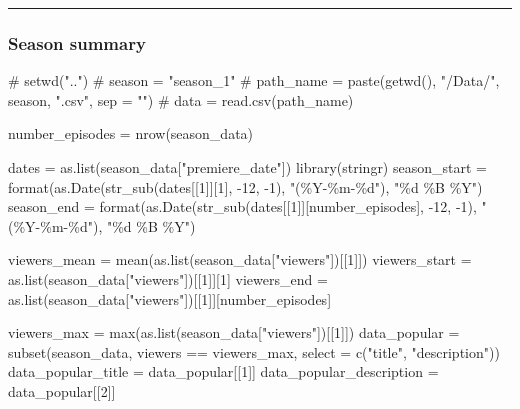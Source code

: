 \documentclass[
  letterpaper,
  DIV=11,
  numbers=noendperiod]{scrartcl}
\newenvironment{Shaded}{\begin{snugshade}}{\end{snugshade}}
\newcommand{\AttributeTok}[1]{\textcolor[rgb]{0.40,0.45,0.13}{#1}}
\newcommand{\CommentTok}[1]{\textcolor[rgb]{0.37,0.37,0.37}{#1}}
\newcommand{\DecValTok}[1]{\textcolor[rgb]{0.68,0.00,0.00}{#1}}
\newcommand{\FunctionTok}[1]{\textcolor[rgb]{0.28,0.35,0.67}{#1}}
\newcommand{\NormalTok}[1]{\textcolor[rgb]{0.00,0.23,0.31}{#1}}
\newcommand{\OtherTok}[1]{\textcolor[rgb]{0.00,0.23,0.31}{#1}}
\newcommand{\SpecialCharTok}[1]{\textcolor[rgb]{0.37,0.37,0.37}{#1}}
\newcommand{\StringTok}[1]{\textcolor[rgb]{0.13,0.47,0.30}{#1}}
\begin{document}
\begin{center}\rule{0.5\linewidth}{0.5pt}\end{center}

\hypertarget{season-summary}{%
\subsubsection{Season summary}\label{season-summary}}

\begin{Shaded}
\begin{Highlighting}[]
\CommentTok{\# setwd("..")}
\CommentTok{\# season = "season\_1"}
\CommentTok{\# path\_name = paste(getwd(), "/Data/", season, ".csv", sep = "")}
\CommentTok{\# data = read.csv(path\_name)}

\NormalTok{number\_episodes }\OtherTok{=} \FunctionTok{nrow}\NormalTok{(season\_data)}

\NormalTok{dates }\OtherTok{=} \FunctionTok{as.list}\NormalTok{(season\_data[}\StringTok{"premiere\_date"}\NormalTok{])}
\FunctionTok{library}\NormalTok{(stringr)}
\NormalTok{season\_start }\OtherTok{=} \FunctionTok{format}\NormalTok{(}\FunctionTok{as.Date}\NormalTok{(}\FunctionTok{str\_sub}\NormalTok{(dates[[}\DecValTok{1}\NormalTok{]][}\DecValTok{1}\NormalTok{], }\SpecialCharTok{{-}}\DecValTok{12}\NormalTok{, }\SpecialCharTok{{-}}\DecValTok{1}\NormalTok{), }\StringTok{"(\%Y{-}\%m{-}\%d"}\NormalTok{), }\StringTok{"\%d \%B \%Y"}\NormalTok{)}
\NormalTok{season\_end }\OtherTok{=} \FunctionTok{format}\NormalTok{(}\FunctionTok{as.Date}\NormalTok{(}\FunctionTok{str\_sub}\NormalTok{(dates[[}\DecValTok{1}\NormalTok{]][number\_episodes], }\SpecialCharTok{{-}}\DecValTok{12}\NormalTok{, }\SpecialCharTok{{-}}\DecValTok{1}\NormalTok{), }\StringTok{"(\%Y{-}\%m{-}\%d"}\NormalTok{), }\StringTok{"\%d \%B \%Y"}\NormalTok{)}

\NormalTok{viewers\_mean }\OtherTok{=} \FunctionTok{mean}\NormalTok{(}\FunctionTok{as.list}\NormalTok{(season\_data[}\StringTok{"viewers"}\NormalTok{])[[}\DecValTok{1}\NormalTok{]])}
\NormalTok{viewers\_start }\OtherTok{=} \FunctionTok{as.list}\NormalTok{(season\_data[}\StringTok{"viewers"}\NormalTok{])[[}\DecValTok{1}\NormalTok{]][}\DecValTok{1}\NormalTok{]}
\NormalTok{viewers\_end }\OtherTok{=} \FunctionTok{as.list}\NormalTok{(season\_data[}\StringTok{"viewers"}\NormalTok{])[[}\DecValTok{1}\NormalTok{]][number\_episodes]}

\NormalTok{viewers\_max }\OtherTok{=} \FunctionTok{max}\NormalTok{(}\FunctionTok{as.list}\NormalTok{(season\_data[}\StringTok{"viewers"}\NormalTok{])[[}\DecValTok{1}\NormalTok{]])}
\NormalTok{data\_popular }\OtherTok{=} \FunctionTok{subset}\NormalTok{(season\_data, viewers }\SpecialCharTok{==}\NormalTok{ viewers\_max, }\AttributeTok{select =} \FunctionTok{c}\NormalTok{(}\StringTok{"title"}\NormalTok{, }\StringTok{"description"}\NormalTok{))}
\NormalTok{data\_popular\_title }\OtherTok{=}\NormalTok{ data\_popular[[}\DecValTok{1}\NormalTok{]]}
\NormalTok{data\_popular\_description }\OtherTok{=}\NormalTok{ data\_popular[[}\DecValTok{2}\NormalTok{]]}
\end{Highlighting}
\end{Shaded}
\end{document}
